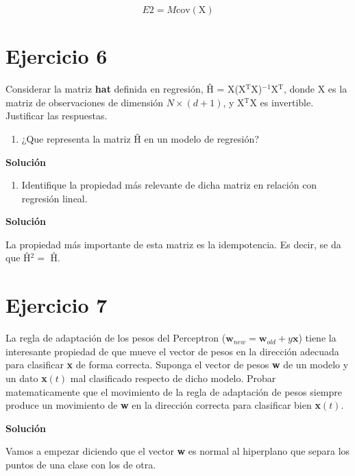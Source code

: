\documentclass[11pt,a4paper]{article}
\newcommand{\answer}{\noindent\textbf{Solución}}
\newcommand{\cov}{\text{cov}}
\begin{document}
\begin{equation}
	E2 = M \cov(\text{X})
\end{equation}

\section*{Ejercicio 6}

\noindent Considerar la matriz \textbf{hat} definida en regresión, Ĥ = X(X$^\text{T}$X)$^{-1}$X$^\text{T}$, donde X es la
matriz de observaciones de dimensión $N \times (d + 1)$, y X$^\text{T}$X es invertible. Justificar las respuestas.

\begin{enumerate}[label=\textit{\alph*})]
	\item ¿Que representa la matriz Ĥ en un modelo de regresión?
\end{enumerate}

\answer

\begin{enumerate}[resume,label=\textit{\alph*})]
	\item Identifique la propiedad más relevante de dicha matriz en relación con regresión lineal.
\end{enumerate}

\answer

La propiedad más importante de esta matriz es la idempotencia. Es decir, se da que Ĥ$^2 = $ Ĥ.

\section*{Ejercicio 7}

\noindent La regla de adaptación de los pesos del Perceptron ($\mathbf{w}_{new} = \mathbf{w}_{old} + y\mathbf{x}$) tiene
la interesante propiedad de que mueve el vector de pesos en la dirección adecuada para clasificar \textbf{x} de forma
correcta. Suponga el vector de pesos \textbf{w} de un modelo y un dato \textbf{x}$(t)$ mal clasificado respecto de dicho
modelo. Probar matematicamente que el movimiento de la regla de adaptación de pesos siempre produce un movimiento de
\textbf{w} en la dirección correcta para clasificar bien \textbf{x}$(t)$.

\answer

Vamos a empezar diciendo que el vector \textbf{w} es normal al hiperplano que separa los puntos de una clase con los de
otra.
\end{document}
